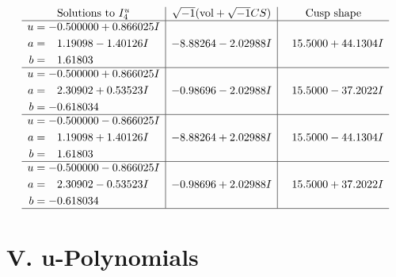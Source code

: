 \documentclass[1p]{elsarticle_modified}
\theoremstyle{definition}
\newcommand{\I}{\sqrt{-1}}
\begin{document}
$$\begin{array}{c|c|c}  
\text{Solutions to }I^u_{4}& \I (\text{vol} + \sqrt{-1}CS) & \text{Cusp shape}\\
 \hline 
\begin{aligned}
u &= -0.500000 + 0.866025 I \\
a &= \phantom{-}1.19098 - 1.40126 I \\
b &= \phantom{-}1.61803\phantom{ +0.000000I}\end{aligned}
 & -8.88264 - 2.02988 I & \phantom{-}15.5000 + 44.1304 I \\ \hline\begin{aligned}
u &= -0.500000 + 0.866025 I \\
a &= \phantom{-}2.30902 + 0.53523 I \\
b &= -0.618034\phantom{ +0.000000I}\end{aligned}
 & -0.98696 - 2.02988 I & \phantom{-}15.5000 - 37.2022 I \\ \hline\begin{aligned}
u &= -0.500000 - 0.866025 I \\
a &= \phantom{-}1.19098 + 1.40126 I \\
b &= \phantom{-}1.61803\phantom{ +0.000000I}\end{aligned}
 & -8.88264 + 2.02988 I & \phantom{-}15.5000 - 44.1304 I \\ \hline\begin{aligned}
u &= -0.500000 - 0.866025 I \\
a &= \phantom{-}2.30902 - 0.53523 I \\
b &= -0.618034\phantom{ +0.000000I}\end{aligned}
 & -0.98696 + 2.02988 I & \phantom{-}15.5000 + 37.2022 I\\
 \hline 
 \end{array}$$\newpage
\newpage\renewcommand{\arraystretch}{1}
\centering \section*{ V. u-Polynomials}
\end{document}
